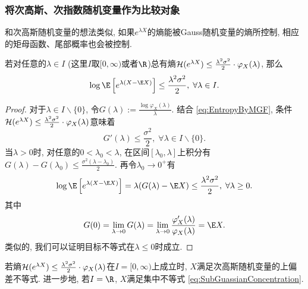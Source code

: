 \subsubsection{将次高斯、次指数随机变量作为比较对象}

和次高斯随机变量的想法类似, 如果$e^{\lambda X}$的熵能被Gauss随机变量的熵所控制, 相应的矩母函数、尾部概率也会被控制.
\begin{theorem}[Herbst方法]\label{thm:HerbstArgument}
	若对任意的$\lambda \in I$ (这里$I$取$[0, \infty)$或者$\R$)总有熵$\mathcal{H}(e^{\lambda X}) \leq \frac{\lambda^2 \sigma^2}{2} \cdot \varphi_X(\lambda)$, 那么
	\begin{equation*}
		\log \E\left[e^{\lambda(X - \E X)}\right] 
		\leq \frac{\lambda^2 \sigma^2}{2} ,\; 
		\forall \lambda \in I. 
	\end{equation*}
\end{theorem}
\begin{proof}
	对于$\lambda \in I \backslash \{0\}$, 令$G(\lambda) := \frac{\log \varphi_X(\lambda)}{\lambda}$. 
	结合 \eqref{eq:EntropyByMGF}, 条件$\mathcal{H}(e^{\lambda X}) \leq \frac{\lambda^2 \sigma^2}{2} \cdot \varphi_X(\lambda)$意味着
	\begin{equation*}
		G'(\lambda) \leq \frac{\sigma^2}{2},\; \forall \lambda \in I \backslash \{0\}. 
	\end{equation*}
	当$\lambda > 0$时, 对任意的$0 < \lambda_0 < \lambda$, 在区间$[\lambda_0, \lambda]$上积分有$G(\lambda) - G(\lambda_0) \leq \frac{\sigma^2 (\lambda - \lambda_0)}{2}$. 
	再令$\lambda_0 \to 0^+$有
	\begin{equation*}
		\log \E\left[e^{\lambda(X - \E X)}\right]
		= \lambda(G(\lambda) - \E X)
		\leq \frac{\lambda^2 \sigma^2}{2} ,\; 
		\forall \lambda \geq 0. 
	\end{equation*}
	其中
	\begin{equation*}
		G(0) 
		= \lim_{\lambda \to 0} G(\lambda) 
		= \lim_{\lambda \to 0} \frac{\varphi_X'(\lambda)}{\varphi_X(\lambda)}
		= \E X. 
	\end{equation*}
	类似的, 我们可以证明目标不等式在$\lambda \leq 0$时成立. 
\end{proof}
\begin{corollary}
	若熵$\mathcal{H}(e^{\lambda X}) \leq \frac{\lambda^2 \sigma^2}{2} \cdot \varphi_X(\lambda)$在$I = [0, \infty)$上成立时, $X$满足次高斯随机变量的上偏差不等式. 
	进一步地, 若$I = \R$, $X$满足集中不等式 \eqref{eq:SubGuassianConcentration}. 
\end{corollary}

